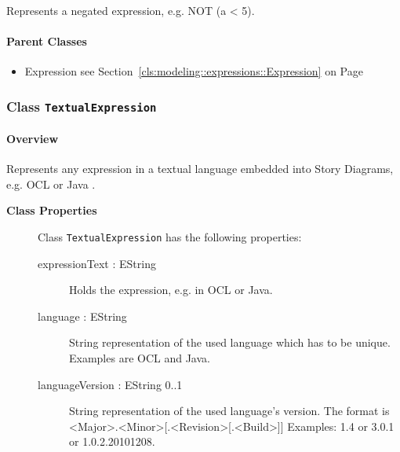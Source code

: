 	
			
Represents a negated expression, e.g. NOT (a < 5).	
		
	



\paragraph{Parent Classes}
\begin{itemize}
\item Expression see Section~\ref{cls:modeling::expressions::Expression} on Page~\pageref{cls:modeling::expressions::Expression}\end{itemize}
\subsubsection{\Large{Class \bfseries \texttt{TextualExpression}\normalfont}}
\label{cls:modeling::expressions::TextualExpression} 
\paragraph{Overview}

	
			
Represents any expression in a textual language embedded into Story Diagrams, e.g. OCL or Java .	
		
	


\begin{description}

	\item[\textbf{Class Properties}] Class \texttt{TextualExpression} has the following properties:
	\begin{description}
\item[expressionText : EString 	]
\hspace{\fill}
\nopagebreak


	
			
Holds the expression, e.g. in OCL or Java.	
		
	
\item[language : EString 	]
\hspace{\fill}
\nopagebreak


	
			
String representation of the used language which has to be unique. Examples are OCL and Java.	
		
	
\item[languageVersion : EString 			0..1]
\hspace{\fill}
\nopagebreak


	
			
String representation of the used language's version. The format is <Major>.<Minor>[.<Revision>[.<Build>]]
Examples: 1.4 or 3.0.1 or 1.0.2.20101208.	
		
	
	\end{description}
	
	

\end{description}

